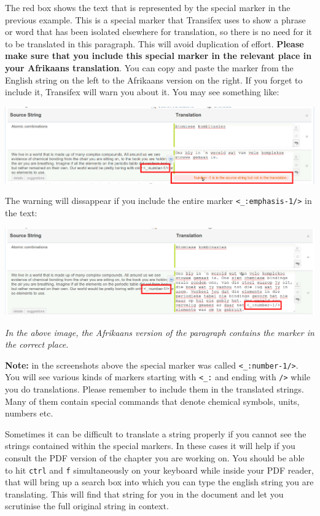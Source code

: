 \documentclass[12pt, a4paper]{article}
\begin{document}
The red box shows the text that is represented by the special marker in the previous example. This is a special marker that Transifex uses to show a phrase or word that has been isolated elsewhere for translation, so there is no need for it to be translated in this paragraph. This will avoid duplication of effort. \textbf{Please make sure that you include this special marker in the relevant place in your Afrikaans translation}. You can copy and paste the marker from the English string on the left to the Afrikaans version on the right.  If you forget to include it, Transifex will warn you about it. You may see something like:
\begin{center}
    \centerline{\includegraphics[width=0.8\paperwidth]{images/extra_tags.png}}
\end{center}
The warning will dissappear if you include the entire marker \verb|<_:emphasis-1/>| in the text:
\begin{center}
    \centerline{\includegraphics[width=0.8\paperwidth]{images/extra_tags-2.png}}
\small\it
In the above image, the Afrikaans version of the paragraph contains the marker in the correct place.
\end{center}



\textbf{Note:} in the screenshots above the special marker was called \verb|<_:number-1/>|. You will see various kinds of markers starting with \verb|<_:| and ending with \verb|/>| while you do translations. Please remember to include them in the translated strings. Many of them contain special commands that denote chemical symbols, units, numbers etc.

Sometimes it can be difficult to translate a string properly if you cannot see the strings contained within the special markers. In these cases it will help if you consult the PDF version of the chapter you are working on. You should be able to hit \texttt{ctrl} and \texttt{f} simultaneously on your keyboard while inside your PDF reader, that will bring up a search box into which you can type the english string you are translating. This will find that string for you in the document and let you scrutinise the full original string in context.
\end{document}
